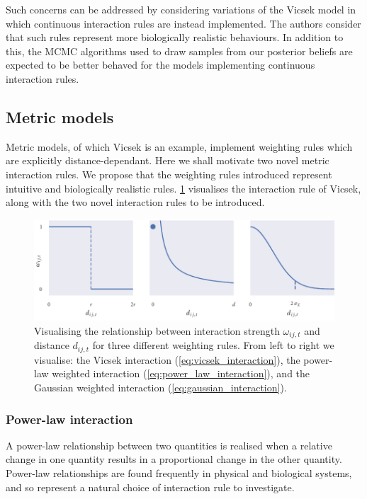 Such concerns can be addressed by considering variations of the Vicsek model in which
continuous interaction rules are instead implemented. The authors consider that such rules
represent more biologically realistic behaviours. In addition to this, the MCMC algorithms
used to draw samples from our posterior beliefs are expected to be better behaved for the
models implementing continuous interaction rules.

\subsection{Metric models}

Metric models, of which Vicsek is an example, implement weighting rules which are
explicitly distance-dependant. Here we shall motivate two novel metric interaction rules.
We propose that the weighting rules introduced represent intuitive and biologically
realistic rules. \cref{fig:weighting_rules} visualises the interaction rule of Vicsek,
along with the two novel interaction rules to be introduced.

\begin{figure}[tb]
    \includegraphics{weighting_rules.pdf}
    \caption{Visualising the relationship between interaction strength $\omega_{ij,t}$ and
        distance $d_{ij,t}$ for three different weighting rules. From left to right we
        visualise: the Vicsek interaction (\cref{eq:vicsek_interaction}), the power-law
        weighted interaction (\cref{eq:power_law_interaction}), and the Gaussian weighted
    interaction (\cref{eq:gaussian_interaction}).}
    \label{fig:weighting_rules}
\end{figure}

\subsubsection{Power-law interaction}

A power-law relationship between two quantities is realised when a relative change in
one quantity results in a proportional change in the other quantity. Power-law
relationships are found frequently in physical and biological systems, and so represent a
natural choice of interaction rule to investigate.

